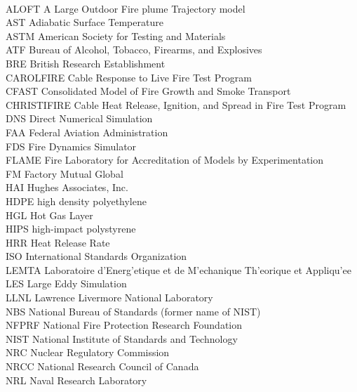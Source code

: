 \documentclass[11pt]{book}
\begin{document}
\begin{tabbing}
\hspace{1.5in} \= \\
ALOFT \> A Large Outdoor Fire plume Trajectory model \\
AST \> Adiabatic Surface Temperature \\
ASTM \> American Society for Testing and Materials \\
ATF \> Bureau of Alcohol, Tobacco, Firearms, and Explosives \\
BRE \> British Research Establishment \\
CAROLFIRE \> Cable Response to Live Fire Test Program \\
CFAST \> Consolidated Model of Fire Growth and Smoke Transport \\
CHRISTIFIRE \> Cable Heat Release, Ignition, and Spread in Fire Test Program \\
DNS \> Direct Numerical Simulation \\
FAA \> Federal Aviation Administration \\
FDS \> Fire Dynamics Simulator \\
FLAME \> Fire Laboratory for Accreditation of Models by Experimentation \\
FM \> Factory Mutual Global \\
HAI \> Hughes Associates, Inc. \\
HDPE \> high density polyethylene \\
HGL \> Hot Gas Layer \\
HIPS \> high-impact polystyrene \\
HRR \> Heat Release Rate \\
ISO \> International Standards Organization \\
LEMTA \> Laboratoire d'Energ\a'{e}tique et de M\a'{e}chanique Th\a'{e}orique et Appliqu\a'{e}e \\
LES \> Large Eddy Simulation \\
LLNL \> Lawrence Livermore National Laboratory \\
NBS \> National Bureau of Standards (former name of NIST) \\
NFPRF \> National Fire Protection Research Foundation \\
NIST \> National Institute of Standards and Technology \\
NRC \> Nuclear Regulatory Commission \\
NRCC \> National Research Council of Canada \\
NRL \> Naval Research Laboratory \\

\end{tabbing}
\end{document}
